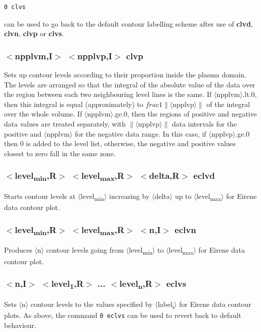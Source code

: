 \documentclass[a4paper,10pt]{report}
\begin{document}
\begin{verbatim}
0 clvs
\end{verbatim}
can be used to go back to the default contour labelling scheme after use
of {\bf clvd}, {\bf clvn}, {\bf clvp} or {\bf clvs}.

\subsubsection{$<$npplvm,{\bf I}$>$ $<$npplvp,{\bf I}$>$ clvp}\label{sec:clvp}
Sets up contour levels according to their proportion inside the plasma domain.
The levels are arranged so that the integral of the absolute value of
the data over the region between each two neighbouring level lines is the same.
If $\langle$npplvm$\rangle$.lt.0, then this integral is equal (approximately)
to $frac{1}{\|\langle\text{npplvp}\rangle\|}$ of the integral over the whole volume.
If $\langle$npplvm$\rangle$.ge.0, then the regions of positive and negative data
values are treated separately, with $\|\langle$npplvp$\rangle\|$ data intervals for
the positive and $\langle$npplvm$\rangle$ for the negative data range. In this case,
if $\langle$npplvp$\rangle$.ge.0 then 0 is added to the level list, otherwise, the
negative and positive values closest to zero fall in the same zone.

\subsubsection{$<$level\textsubscript{min},{\bf R}$>$ $<$level\textsubscript{max},{\bf R}$>$ $<$delta,{\bf R}$>$ eclvd}\label{sec:eclvd}
Starts contour levels at $\langle$level\textsubscript{min}$\rangle$ increasing by $\langle$delta$\rangle$ up
to $\langle$level\textsubscript{max}$\rangle$ for Eirene data contour plot.

\subsubsection{$<$level\textsubscript{min},{\bf R}$>$ $<$level\textsubscript{max},{\bf R}$>$ $<$n,{\bf I}$>$ eclvn}\label{sec:eclvn}
Produces $\langle$n$\rangle$ contour levels going from $\langle$level\textsubscript{min}$\rangle$ to $\langle$level\textsubscript{max}$\rangle$ for Eirene data contour plot.

\subsubsection{$<$n,{\bf I}$>$ $<$level\textsubscript{1},{\bf R}$>$ ... $<$level\textsubscript{n},{\bf R}$>$ eclvs}\label{sec:eclvs}
Sets $\langle$n$\rangle$ contour levels to the values specified by $\langle$label\textsubscript{i}$\rangle$ for Eirene data contour plots.
As above, the command {\tt 0 eclvs} can be used to revert back to default behaviour.
\end{document}
